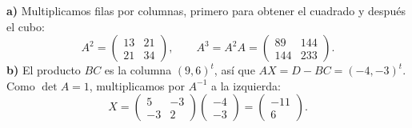 \textbf{a)} Multiplicamos filas por columnas, primero para obtener el cuadrado y después el cubo:
\[
A^2=\begin{pmatrix}13&21\\21&34\end{pmatrix},\qquad
A^3=A^2A=\boxed{\begin{pmatrix}89&144\\144&233\end{pmatrix}}.
\]
\textbf{b)} El producto $BC$ es la columna $(9,6)^t$, así que $AX=D-BC=(-4,-3)^t$. Como $\det A=1$, multiplicamos por $A^{-1}$ a la izquierda:
\[
X=\begin{pmatrix}5&-3\\-3&2\end{pmatrix}\begin{pmatrix}-4\\-3\end{pmatrix}
=\boxed{\begin{pmatrix}-11\\6\end{pmatrix}}.
\]
